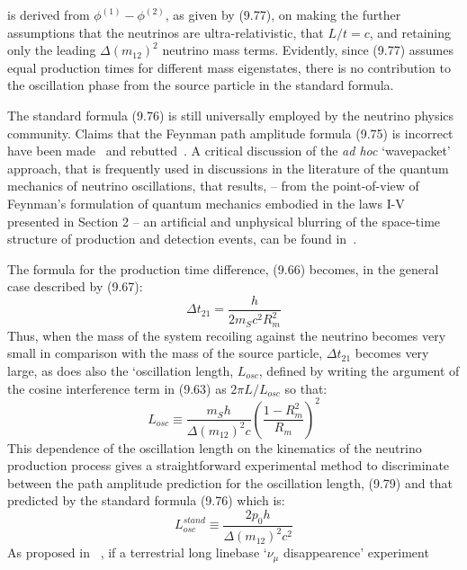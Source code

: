 {   is derived from $ \phi^{(1)}-  \phi^{(2)}$, 
  as given by (9.77), on making the further assumptions that the neutrinos are ultra-relativistic,
   that $L/t = c$, and retaining only the leading $\Delta(m_{12})^2$ neutrino mass terms.
   Evidently, since (9.77) assumes equal production times for different mass eigenstates,
   there is no contribution to the 
   oscillation phase from the source particle in the standard formula. 
   \par The standard formula (9.76) is still universally employed by the neutrino physics
   community. Claims that the Feynman path amplitude formula (9.75) is incorrect 
   have been made~\cite{Giunti} and rebutted~\cite{JHF1,JHF4}. A critical discussion of the
  {\it ad hoc} `wavepacket' approach, that is frequently used in discussions in the
  literature of the quantum mechanics of neutrino oscillations, that results,
   -- from the point-of-view of Feynman's formulation of quantum mechanics embodied
   in the laws I-V presented in Section 2 -- an
   artificial and unphysical
  blurring of the space-time structure of production and detection events, can be found in~\cite{JHF1,JHF2}.
   \par The formula for the production time difference, (9.66) becomes, in the general case
   described by (9.67):
    \begin{equation}
    \Delta t_{21} = \frac{h}{2m_S c^2 R_m^2}
   \end{equation} 
   Thus, when the mass of the system recoiling against the neutrino becomes very small in comparison
   with the mass of the source particle, $ \Delta t_{21}$ becomes very large, as does also
   the `oscillation length, $L_{osc}$, defined by writing the argument of the cosine
   interference term in (9.63) as $2 \pi L/L_{osc}$ so that:
     \begin{equation}
      L_{osc} \equiv \frac{m_S h}{\Delta(m_{12})^2 c} \left(\frac{1-R_m^2}{R_m}\right)^2 
   \end{equation} 
      This dependence of the oscillation length on the kinematics of the neutrino production
   process gives a straightforward  experimental method to discriminate between the path amplitude
   prediction for the oscillation length, (9.79) and that predicted by the standard formula (9.76)
   which is: 
       \begin{equation}
      L_{osc}^{stand} \equiv \frac{ 2 p_0 h}{\Delta(m_{12})^2 c^2}
     \end{equation}   
   As proposed in ~\cite{JHF3}, if a terrestrial long linebase `$\nu_{\mu}$ disappearence' experiment
}
